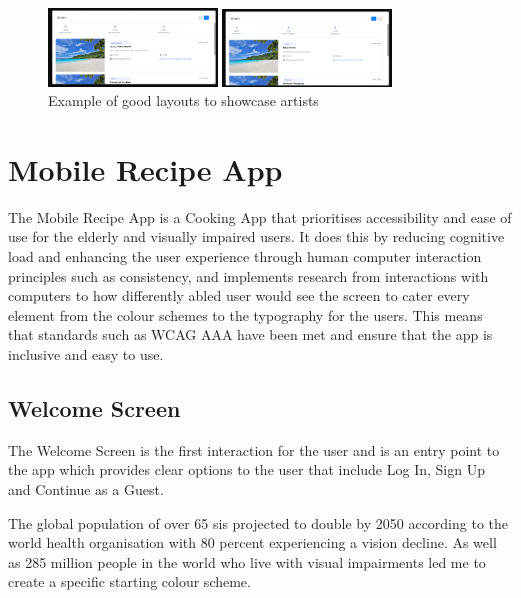\documentclass[]{project_final}
\begin{document}
\begin{figure}[ht!]
    \centering
    \begin{minipage}[t]{0.4\textwidth}
        \includegraphics[width=0.4\textwidth]{itin2.png}
    \end{minipage}
    \hfill
    \begin{minipage}[t]{0.4\textwidth}
        \includegraphics[width=0.4\textwidth]{itin3.png}
    \end{minipage}
    \caption{Example of good layouts to showcase artists}
    \label{fig:1}
\end{figure}


\newpage




\section{Mobile Recipe App}
The Mobile Recipe App is a Cooking App that prioritises accessibility and ease of use for the elderly and visually impaired users. It does this by reducing cognitive load and enhancing the user experience through human computer interaction principles such as consistency, and implements research from interactions with computers to how differently abled user would see the screen to cater every element from the colour schemes to the typography for the users. This means that standards such as WCAG AAA have been met and ensure that the app is inclusive and easy to use.

\subsection{Welcome Screen}
The Welcome Screen is the first interaction for the user and is an entry point to the app which provides clear options to the user that include Log In, Sign Up and Continue as a Guest.

The global population of over 65 sis projected to double by 2050 according to the world health organisation with 80 percent experiencing a vision decline. As well as 285 million people in the world who live with visual impairments led me to create a specific starting colour scheme.
\end{document}
